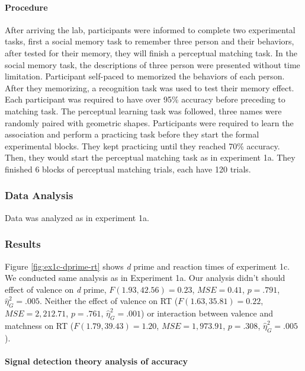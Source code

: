 \documentclass[
  english,
  man]{apa6}
\let\oldparagraph\paragraph
\renewcommand{\paragraph}[1]{\oldparagraph{#1}\mbox{}}
\begin{document}
\hypertarget{procedure-2}{%
\paragraph{Procedure}\label{procedure-2}}

After arriving the lab, participants were informed to complete two experimental tasks, first a social memory task to remember three person and their behaviors, after tested for their memory, they will finish a perceptual matching task.
In the social memory task, the descriptions of three person were presented without time limitation. Participant self-paced to memorized the behaviors of each person. After they memorizing, a recognition task was used to test their memory effect. Each participant was required to have over 95\% accuracy before preceding to matching task.
The perceptual learning task was followed, three names were randomly paired with geometric shapes. Participants were required to learn the association and perform a practicing task before they start the formal experimental blocks. They kept practicing until they reached 70\% accuracy. Then, they would start the perceptual matching task as in experiment 1a. They finished 6 blocks of perceptual matching trials, each have 120 trials.

\hypertarget{data-analysis-3}{%
\subsubsection{Data Analysis}\label{data-analysis-3}}

Data was analyzed as in experiment 1a.

\hypertarget{results-2}{%
\subsubsection{Results}\label{results-2}}

Figure \ref{fig:ex1c-dprime-rt} shows \emph{d} prime and reaction times of experiment 1c. We conducted same analysis as in Experiment 1a. Our analysis didn't should effect of valence on \emph{d} prime, \(F(1.93, 42.56) = 0.23\), \(\mathit{MSE} = 0.41\), \(p = .791\), \(\hat{\eta}^2_G = .005\). Neither the effect of valence on RT (\(F(1.63, 35.81) = 0.22\), \(\mathit{MSE} = 2,212.71\), \(p = .761\), \(\hat{\eta}^2_G = .001\)) or interaction between valence and matchness on RT (\(F(1.79, 39.43) = 1.20\), \(\mathit{MSE} = 1,973.91\), \(p = .308\), \(\hat{\eta}^2_G = .005\)).

\hypertarget{signal-detection-theory-analysis-of-accuracy-1}{%
\paragraph{Signal detection theory analysis of accuracy}\label{signal-detection-theory-analysis-of-accuracy-1}}
\end{document}
